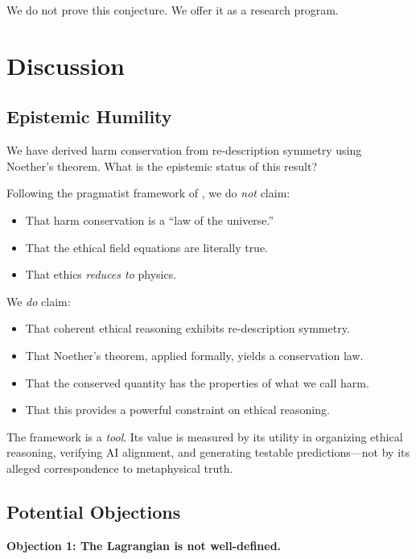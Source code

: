 \documentclass[12pt,letterpaper]{article}
\theoremstyle{definition}
\theoremstyle{remark}
\begin{document}
We do not prove this conjecture. We offer it as a research program.

\section{Discussion}

\subsection{Epistemic Humility}

We have derived harm conservation from re-description symmetry using Noether's theorem. What is the epistemic status of this result?

Following the pragmatist framework of \cite{bond2025pragmatist}, we do \textit{not} claim:
\begin{itemize}
    \item That harm conservation is a ``law of the universe.''
    \item That the ethical field equations are literally true.
    \item That ethics \textit{reduces to} physics.
\end{itemize}

We \textit{do} claim:
\begin{itemize}
    \item That coherent ethical reasoning exhibits re-description symmetry.
    \item That Noether's theorem, applied formally, yields a conservation law.
    \item That the conserved quantity has the properties of what we call harm.
    \item That this provides a powerful constraint on ethical reasoning.
\end{itemize}

The framework is a \textit{tool}. Its value is measured by its utility in organizing ethical reasoning, verifying AI alignment, and generating testable predictions---not by its alleged correspondence to metaphysical truth.

\subsection{Potential Objections}

\textbf{Objection 1: The Lagrangian is not well-defined.}
\end{document}
